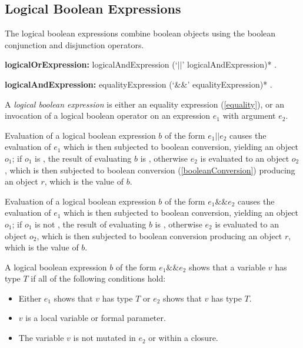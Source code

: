 \documentclass{article}
\begin{document}
\subsection{ Logical Boolean Expressions}

\LMHash{}
The logical boolean expressions combine boolean objects using the boolean conjunction and disjunction operators.

\begin{grammar}
{\bf logicalOrExpression:}
      logicalAndExpression (`$||$' logicalAndExpression)*
    .


{\bf logicalAndExpression:}
      equalityExpression (`\&\&' equalityExpression)*
    .
 \end{grammar}
 
\LMHash{}
A {\em logical boolean expression} is either an equality expression (\ref{equality}), or an invocation of a logical boolean operator on an expression $e_1$ with argument $e_2$.
 
\LMHash{}
Evaluation of a logical boolean expression $b$ of the form $e_1 || e_2$ causes the evaluation of $e_1$ which is then  subjected to boolean conversion, yielding an object $o_1$; if $o_1$ is \TRUE, the result of evaluating $b$ is \TRUE, otherwise $e_2$ is evaluated to an object $o_2$, which is then subjected to boolean conversion (\ref{booleanConversion}) producing an object $r$, which is the value of $b$. 

\LMHash{}
Evaluation of a logical boolean expression $b$ of the form $e_1 \&\& e_2$ causes the evaluation of $e_1$ which is then subjected to boolean conversion, yielding an object $o_1$; if $o_1$ is not  \TRUE, the result of evaluating $b$ is \FALSE, otherwise $e_2$ is evaluated to an object $o_2$, which is then subjected to boolean conversion producing an object $r$, which is the value of $b$. 

\LMHash{}
A logical boolean expression $b$ of the form $e_1 \&\& e_2$ shows that a variable $v$ has type 
$T$ if all of the following conditions hold:
\begin{itemize}
\item Either $e_1$ shows that $v$ has type $T$ or $e_2$ shows that $v$ has type $T$.
\item $v$ is a local variable or formal parameter.
\item The variable $v$ is not mutated in $e_2$ or within a closure.
\end{itemize}
\end{document}
